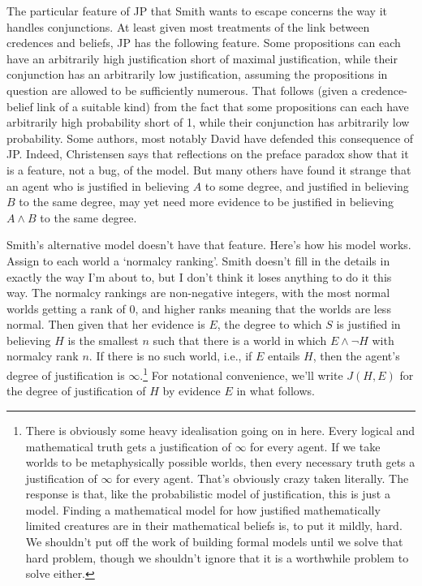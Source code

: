 The particular feature of JP that Smith wants to escape concerns the way it handles conjunctions. At least given most treatments of the link between credences and beliefs, JP has the following feature. Some propositions can each have an arbitrarily high justification short of maximal justification, while their conjunction has an arbitrarily low justification, assuming the propositions in question are allowed to be sufficiently numerous. That follows (given a credence-belief link of a suitable kind) from the fact that some propositions can each have arbitrarily high probability short of 1, while their conjunction has arbitrarily low probability. Some authors, most notably David \citet{Christensen2005} have defended this consequence of JP. Indeed, Christensen says that reflections on the preface paradox show that it is a feature, not a bug, of the model. But many others have found it strange that an agent who is justified in believing $A$ to some degree, and justified in believing $B$ to the same degree, may yet need more evidence to be justified in believing $A \wedge B$ to the same degree.

Smith's alternative model doesn't have that feature. Here's how his model works. Assign to each world a `normalcy ranking'. Smith doesn't fill in the details in exactly the way I'm about to, but I don't think it loses anything to do it this way. The normalcy rankings are non-negative integers, with the most normal worlds getting a rank of 0, and higher ranks meaning that the worlds are less normal. Then given that her evidence is $E$, the degree to which $S$ is justified in believing $H$ is the smallest $n$ such that there is a world in which $E \wedge \neg H$ with normalcy rank $n$. If there is no such world, i.e., if $E$ entails $H$, then the agent's degree of justification is $\infty$.\footnote{There is obviously some heavy idealisation going on in here. Every logical and mathematical truth gets a justification of $\infty$ for every agent. If we take worlds to be metaphysically possible worlds, then every necessary truth gets a justification of $\infty$ for every agent. That's obviously crazy taken literally. The response is that, like the probabilistic model of justification, this is just a model. Finding a mathematical model for how justified mathematically limited creatures are in their mathematical beliefs is, to put it mildly, hard. We shouldn't put off the work of building formal models until we solve that hard problem, though we shouldn't ignore that it is a worthwhile problem to solve either.} For notational convenience, we'll write $J(H, E)$ for the degree of justification of $H$ by evidence $E$ in what follows.

